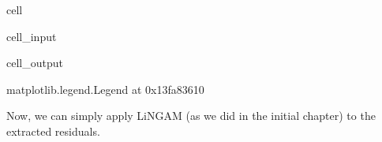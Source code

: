 \documentclass[letterpaper,10pt,english]{jupyterBook}
\begin{document}
\begin{sphinxuseclass}{cell}\begin{sphinxVerbatimInput}

\begin{sphinxuseclass}{cell_input}
\begin{sphinxVerbatim}[commandchars=\\\{\}]
   \PYG{p}{[}\PYG{p}{]}
     \PYG{p}{[} \PYG{p}{]} \PYG{p}{[}\PYG{p}{]}
\end{sphinxVerbatim}

\end{sphinxuseclass}\end{sphinxVerbatimInput}
\begin{sphinxVerbatimOutput}

\begin{sphinxuseclass}{cell_output}
\begin{sphinxVerbatim}[commandchars=\\\{\}]
\PYGZlt{}matplotlib.legend.Legend at 0x13fa83610\PYGZgt{}
\end{sphinxVerbatim}

\noindent{}

\end{sphinxuseclass}\end{sphinxVerbatimOutput}

\end{sphinxuseclass}
\sphinxAtStartPar
Now, we can simply apply LiNGAM (as we did in the initial chapter) to the extracted residuals.
\end{document}
